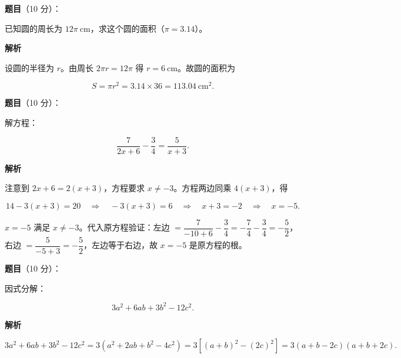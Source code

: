 \begin{answer}

\textbf{题目}（10 分）：

已知圆的周长为 $12\pi\ \mathrm{cm}$，求这个圆的面积（$\pi=3.14$）。

\textbf{解析}

设圆的半径为 $r$。由周长 $2\pi r=12\pi$ 得 $r=6\ \mathrm{cm}$。故圆的面积为

\nopagebreak[4]
\[
S=\pi r^2=3.14\times36=113.04\ \mathrm{cm^2}.
\]


\end{answer}
\begin{answer}

\textbf{题目}（10 分）：

解方程：

\nopagebreak[4]
\[
\frac{7}{2x+6}-\frac34=\frac{5}{x+3}.
\]

\textbf{解析}

注意到 $2x+6=2(x+3)$，方程要求 $x\ne-3$。方程两边同乘 $4(x+3)$，得

\nopagebreak[4]
\[
14-3(x+3)=20
\quad\Longrightarrow\quad
-3(x+3)=6
\quad\Longrightarrow\quad
x+3=-2
\quad\Longrightarrow\quad
x=-5.
\]

$x=-5$ 满足 $x\ne-3$。代入原方程验证：左边 $=\dfrac{7}{-10+6}-\dfrac34=-\dfrac74-\dfrac34=-\dfrac52$，右边 $=\dfrac{5}{-5+3}=-\dfrac52$，左边等于右边，故 $x=-5$ 是原方程的根。


\end{answer}
\begin{answer}

\textbf{题目}（10 分）：

因式分解：

\nopagebreak[4]
\[
3a^2+6ab+3b^2-12c^2.
\]

\textbf{解析}

\nopagebreak[4]
\[
3a^2+6ab+3b^2-12c^2
=3\left(a^2+2ab+b^2-4c^2\right)
=3\left[(a+b)^2-(2c)^2\right]
=3(a+b-2c)(a+b+2c).
\]


\end{answer}
